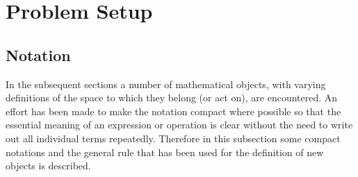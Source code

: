 \section{Problem Setup}
\label{problem_setup}

\subsection{Notation}
In the subsequent sections a number of mathematical objects, with varying definitions of the space to which they belong (or act on), are encountered. An effort has been made to make the notation compact where possible so that the essential meaning of an expression or operation is clear without the need to write out all individual terms repeatedly. Therefore in this subsection some compact notations and the general rule that has been used for the definition of new objects is described.

